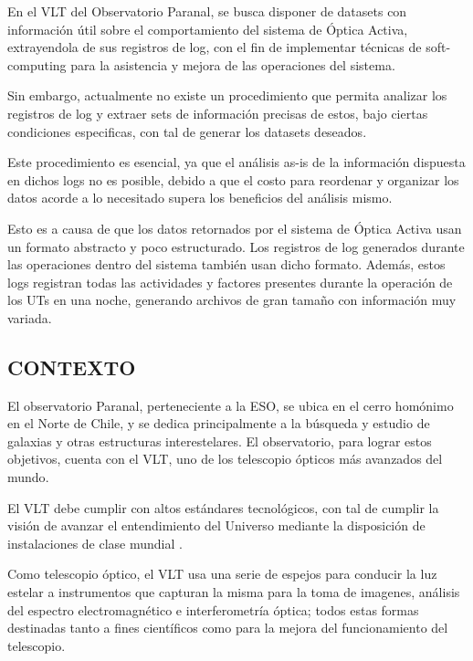 
En el VLT del Observatorio Paranal, se busca disponer de datasets con información útil sobre el comportamiento del sistema de Óptica Activa, extrayendola de sus registros de log, con el fin de implementar técnicas de soft-computing para la asistencia y mejora de las operaciones del sistema.

Sin embargo, actualmente no existe un procedimiento que permita analizar los registros de log y extraer sets de información precisas de estos, bajo ciertas condiciones especificas, con tal de generar los datasets deseados. 

Este procedimiento es esencial, ya que el análisis as-is de la información dispuesta en dichos logs no es posible, debido a que el costo para reordenar y organizar los datos acorde a lo necesitado supera los beneficios del análisis mismo.

Esto es a causa de que los datos retornados por el sistema de Óptica Activa usan un formato abstracto y poco estructurado. Los registros de log generados durante las operaciones dentro del sistema también usan dicho formato. Además, estos logs registran todas las actividades y factores presentes durante la operación de los UTs en una noche, generando archivos de gran tamaño con información muy variada.

\subsection{CONTEXTO}

El observatorio Paranal, perteneciente a la ESO, se ubica en el cerro homónimo en el Norte de Chile, y se dedica principalmente a la búsqueda y estudio de galaxias y otras estructuras interestelares. El observatorio, para lograr estos objetivos, cuenta con el VLT, uno de los telescopio ópticos más avanzados del mundo\cite{eso1998vlt}.

El VLT debe cumplir con altos estándares tecnológicos, con tal de cumplir la visión de avanzar el entendimiento del Universo mediante la disposición de instalaciones de clase mundial \cite{eso1998vlt}.

Como telescopio óptico, el VLT usa una serie de espejos para conducir la luz estelar a instrumentos que capturan la misma para la toma de imagenes, análisis del espectro electromagnético e interferometría óptica; todos estas formas destinadas tanto a fines científicos como para la mejora del funcionamiento del telescopio\cite{eso1998vlt}.

